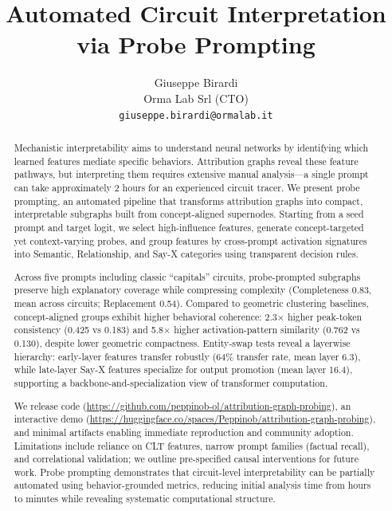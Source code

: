 \documentclass[11pt]{article}
\title{Automated Circuit Interpretation via Probe Prompting}
\author{Giuseppe Birardi\\Orma Lab Srl (CTO)\\\texttt{giuseppe.birardi@ormalab.it}}
\date{}
\begin{document}
\maketitle

\begin{abstract}
Mechanistic interpretability aims to understand neural networks by identifying which learned features mediate specific behaviors. Attribution graphs reveal these feature pathways, but interpreting them requires extensive manual analysis---a single prompt can take approximately 2 hours for an experienced circuit tracer. We present probe prompting, an automated pipeline that transforms attribution graphs into compact, interpretable subgraphs built from concept-aligned supernodes. Starting from a seed prompt and target logit, we select high-influence features, generate concept-targeted yet context-varying probes, and group features by cross-prompt activation signatures into Semantic, Relationship, and Say-X categories using transparent decision rules.

Across five prompts including classic ``capitals'' circuits, probe-prompted subgraphs preserve high explanatory coverage while compressing complexity (Completeness 0.83, mean across circuits; Replacement 0.54). Compared to geometric clustering baselines, concept-aligned groups exhibit higher behavioral coherence: 2.3$\times$ higher peak-token consistency (0.425 vs 0.183) and 5.8$\times$ higher activation-pattern similarity (0.762 vs 0.130), despite lower geometric compactness. Entity-swap tests reveal a layerwise hierarchy: early-layer features transfer robustly (64\% transfer rate, mean layer 6.3), while late-layer Say-X features specialize for output promotion (mean layer 16.4), supporting a backbone-and-specialization view of transformer computation.

We release code (\url{https://github.com/peppinob-ol/attribution-graph-probing}), an interactive demo (\url{https://huggingface.co/spaces/Peppinob/attribution-graph-probing}), and minimal artifacts enabling immediate reproduction and community adoption. Limitations include reliance on CLT features, narrow prompt families (factual recall), and correlational validation; we outline pre-specified causal interventions for future work. Probe prompting demonstrates that circuit-level interpretability can be partially automated using behavior-grounded metrics, reducing initial analysis time from hours to minutes while revealing systematic computational structure.
\end{abstract}










\end{document}
